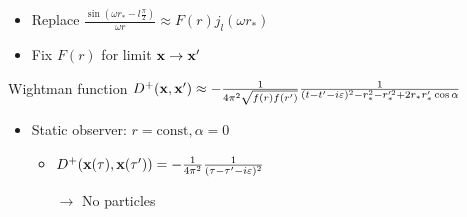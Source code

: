 \documentclass{beamer}
\begin{document}
\begin{frame}
\begin{itemize}
	\item Replace \(\frac{\sin(\omega r_* - l\frac{\pi}{2})}{\omega r} \approx F(r) j_l(\omega r_*)\)
	\item Fix \(F(r)\) for limit \(\vb{x} \to \vb{x}'\)
\end{itemize}
\begin{block}{Wightman function}
	\(D^+(\vb{x}, \vb{x}') \approx -\frac{1}{4\pi^2 \sqrt{f(r)f(r')}} \frac{1}{(t-t'-i\varepsilon)^2 - r_*^2 - r_*'^2 + 2r_*r_*' \cos{\alpha}}\)
\end{block}
\begin{itemize}
	\item Static observer: \(r = \mathrm{const}, \alpha = 0\)
	\begin{itemize}
		\item \(D^+(\vb{x}(\tau), \vb{x}(\tau')) =  -\frac{1}{4\pi^2} \frac{1}{(\tau-\tau'-i\varepsilon)^2}\)
		\item[\(\to\)] No particles
	\end{itemize}
\end{itemize}
\end{frame}
\end{document}
